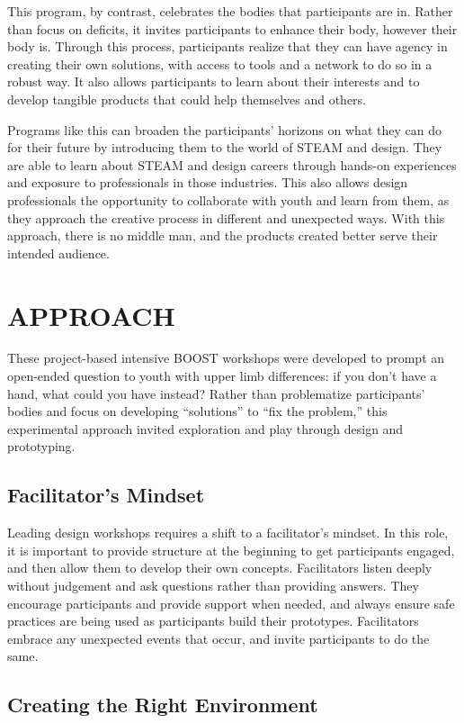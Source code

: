 \documentclass[11.5pt]{sig-alternate} %
\begin{document}
\begin{large}
This program, by contrast, celebrates the bodies that participants are in. Rather than focus on deficits, it invites participants to enhance their body, however their body is. Through this process, participants realize that they can have agency in creating their own solutions, with access to tools and a network to do so in a robust way. It also allows participants to learn about their interests and to develop tangible products that could help themselves and others. 

Programs like this can broaden the participants’ horizons on what they can do for their future by introducing them to the world of STEAM and design. They are able to learn about STEAM and design careers through hands-on experiences and exposure to professionals in those industries. This also allows design professionals the opportunity to collaborate with youth and learn from them, as they approach the creative process in different and unexpected ways. With this approach, there is no middle man, and the products created better serve their intended audience.   

\section*{APPROACH}

These project-based intensive BOOST workshops were developed to prompt an open-ended question to youth with upper limb differences: if you don’t have a hand, what could you have instead? Rather than problematize participants’ bodies and focus on developing “solutions” to “fix the problem,” this experimental approach invited exploration and play through design and prototyping. 

\subsection*{Facilitator’s Mindset}

Leading design workshops requires a shift to a facilitator’s mindset. In this role, it is important to provide structure at the beginning to get participants engaged, and then allow them to develop their own concepts. Facilitators listen deeply without judgement and ask questions rather than providing answers. They encourage participants and provide support when needed, and always ensure safe practices are being used as participants build their prototypes. Facilitators embrace any unexpected events that occur, and invite participants to do the same. 

\subsection*{Creating the Right Environment}


\end{large}
\end{document}
